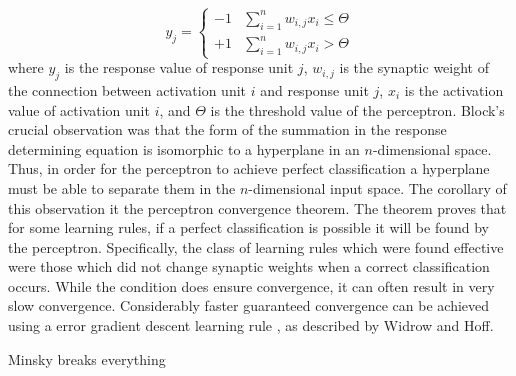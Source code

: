 \documentclass[11pt]{afthesis}
\begin{document}
	\begin{equation} 
	y_j = \begin{cases}
	-1 &\sum_{i=1}^{n} w_{i,j}x_{i} \leq \Theta\\
	+1 &\sum_{i=1}^{n} w_{i,j}x_{i} > \Theta
	\end{cases}
	\end{equation} where \begin{math} y_j \end{math} is the response value of response unit \begin{math} j \end{math}, \begin{math} w_{i,j} \end{math} is the synaptic weight of the connection between activation unit \begin{math} i \end{math} and response unit \begin{math} j \end{math}, \begin{math} x_{i} \end{math} is the activation value of activation unit \begin{math} i \end{math}, and \begin{math} \Theta \end{math} is the threshold value of the perceptron. Block's crucial observation was that the form of the summation in the response determining equation is isomorphic to a hyperplane in an \begin{math}n\end{math}-dimensional space. Thus, in order for the perceptron to achieve perfect classification a hyperplane must be able to separate them in the \begin{math}n\end{math}-dimensional input space. The corollary of this observation it the perceptron convergence theorem. The theorem proves that for some learning rules, if a perfect classification is possible it will be found by the perceptron. Specifically, the class of learning rules which were found effective were those which did not change synaptic weights when a correct classification occurs. While the condition does ensure convergence, it can often result in very slow convergence. Considerably faster guaranteed convergence can be achieved using a error gradient descent learning rule \cite{widrow1960asc}, as described by Widrow and Hoff. 
	
	Minsky breaks everything
	
\end{document}

